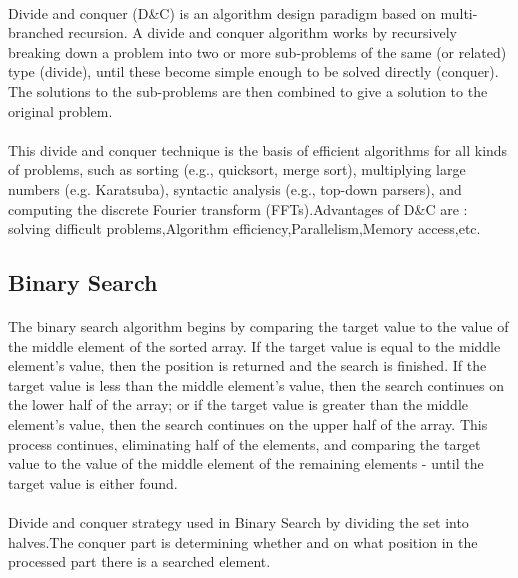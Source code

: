 \documentclass[a4paper,12pt]{article}
\begin{document}
		\paragraph{} Divide and conquer (D\&C) is an algorithm design paradigm based on multi-branched recursion. A divide and conquer algorithm works by recursively breaking down a problem into two or more sub-problems of the same (or related) type (divide), until these become simple enough to be solved directly (conquer). The solutions to the sub-problems are then combined to give a solution to the original problem.
		\paragraph{} This divide and conquer technique is the basis of efficient algorithms for all kinds of problems, such as sorting (e.g., quicksort, merge sort), multiplying large numbers (e.g. Karatsuba), syntactic analysis (e.g., top-down parsers), and computing the discrete Fourier transform (FFTs).Advantages of D\&C are : solving difficult problems,Algorithm efficiency,Parallelism,Memory access,etc.
	
	\subsection{Binary Search}
		\paragraph{} The binary search algorithm begins by comparing the target value to the value of the middle element of the sorted array. If the target value is equal to the middle element's value, then the position is returned and the search is finished. If the target value is less than the middle element's value, then the search continues on the lower half of the array; or if the target value is greater than the middle element's value, then the search continues on the upper half of the array. This process continues, eliminating half of the elements, and comparing the target value to the value of the middle element of the remaining elements - until the target value is either found.
		\paragraph{} Divide and conquer strategy used in Binary Search by dividing the set into halves.The conquer part is determining whether and on what position in the processed part there is a searched element.
		
\end{document}
